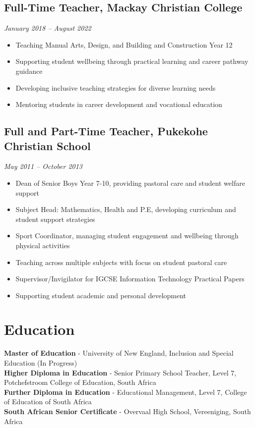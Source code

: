 \documentclass[11pt,a4paper]{article}
\begin{document}
\subsection*{Full-Time Teacher, Mackay Christian College}
\textit{January 2018 – August 2022}
\begin{itemize}
    \item Teaching Manual Arts, Design, and Building and Construction Year 12
    \item Supporting student wellbeing through practical learning and career pathway guidance
    \item Developing inclusive teaching strategies for diverse learning needs
    \item Mentoring students in career development and vocational education
\end{itemize}

\subsection*{Full and Part-Time Teacher, Pukekohe Christian School}
\textit{May 2011 – October 2013}
\begin{itemize}
    \item Dean of Senior Boys Year 7-10, providing pastoral care and student welfare support
    \item Subject Head: Mathematics, Health and P.E, developing curriculum and student support strategies
    \item Sport Coordinator, managing student engagement and wellbeing through physical activities
    \item Teaching across multiple subjects with focus on student pastoral care
    \item Supervisor/Invigilator for IGCSE Information Technology Practical Papers
    \item Supporting student academic and personal development
\end{itemize}

\section*{Education}
\textbf{Master of Education} - University of New England, Inclusion and Special Education (In Progress) \\
\textbf{Higher Diploma in Education} - Senior Primary School Teacher, Level 7, Potchefstroom College of Education, South Africa \\
\textbf{Further Diploma in Education} - Educational Management, Level 7, College of Education of South Africa \\
\textbf{South African Senior Certificate} - Overvaal High School, Vereeniging, South Africa
\end{document}

